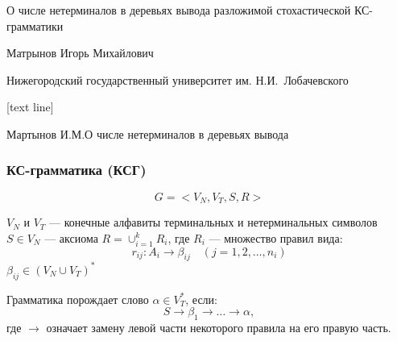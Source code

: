 \documentclass{beamer}
\begin{document}
	
	\begin{frame}
		\begin{center}
			{\LARGE О числе нетерминалов в деревьях вывода разложимой стохастической КС-грамматики }
		\end{center}
		
		\vfill
		
	
		\begin{center}
			{\Large Матрынов Игорь Михайлович}
			
			\vfill
			
			{\small Нижегородский государственный университет им. Н.И.~Лобачевского}
		\end{center}
	\end{frame}
	
	[text line]
	{
		\parbox{\linewidth}{\vspace*{-8pt} \color{gray} Мартынов И.М.\hfill О числе нетерминалов в деревьях вывода \hfill\insertpagenumber}
	}

	\begin{frame}
		\frametitle{КС-грамматика (КСГ)}
		$$
			G = <V_N, V_T, S, R>
		$$
		
		$V_N$ и $V_T$ --- конечные алфавиты терминальных и нетерминальных символов
		$S \in V_N$ --- аксиома
		$R = \cup_{i=1}^k R_i$, где $R_i$ --- множество правил вида:
		\begin{equation*}
		r_{ij} : A_i \rightarrow \beta_{ij}\quad (j = 1,2,\ldots,n_i)
		\end{equation*}
		$\beta_{ij} \in (V_N \cup V_T)^*$
		
		Грамматика порождает слово $\alpha \in V_T^*$, если:
		$$
			S \rightarrow \beta_1 \rightarrow \ldots \rightarrow \alpha,
		$$
		где $\rightarrow$ означает замену левой части некоторого правила на его правую часть.
	\end{frame}
\end{document}
